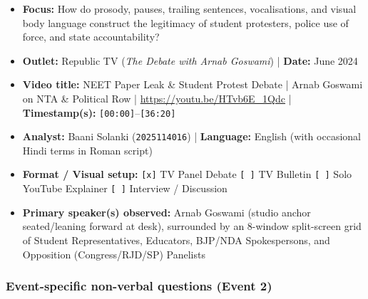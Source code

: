 \documentclass[10pt,a4paper]{article}
\begin{document}
\begin{itemize}
  \item \textbf{Focus:} How do prosody, pauses, trailing sentences, vocalisations, and visual body language construct the legitimacy of student protesters, police use of force, and state accountability?
  \item \textbf{Outlet:} Republic TV (\textit{The Debate with Arnab Goswami}) | \textbf{Date:} June 2024
  \item \textbf{Video title:} NEET Paper Leak \& Student Protest Debate | Arnab Goswami on NTA \& Political Row | \href{https://youtu.be/HTvb6E\_1Qdc}{https://youtu.be/HTvb6E\_1Qdc} | \textbf{Timestamp(s):} \texttt{[00:00]}--\texttt{[36:20]}
  \item \textbf{Analyst:} Baani Solanki (\texttt{2025114016}) | \textbf{Language:} English (with occasional Hindi terms in Roman script)
  \item \textbf{Format / Visual setup:} \texttt{[x]} TV Panel Debate \texttt{[ ]} TV Bulletin \texttt{[ ]} Solo YouTube Explainer \texttt{[ ]} Interview / Discussion
  \item \textbf{Primary speaker(s) observed:} Arnab Goswami (studio anchor seated/leaning forward at desk), surrounded by an 8-window split-screen grid of Student Representatives, Educators, BJP/NDA Spokespersons, and Opposition (Congress/RJD/SP) Panelists
\end{itemize}

\subsubsection*{Event-specific non-verbal questions (Event 2)}
\end{document}
